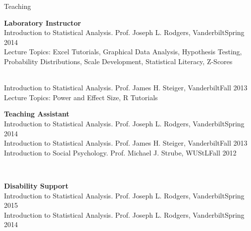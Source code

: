 \documentclass {resume}
\begin{document}
\pagebreak\begin{rSection}{\textrm{Teaching
}}
\vspace*{2pt}
\begin{minipage}{\linewidth}{\large {\bf Laboratory Instructor}\\}
Introduction to Statistical Analysis. Prof. Joseph L. Rodgers, Vanderbilt\hfill  {Spring 2014}\\
\hspace* {6 mm}Lecture Topics: Excel Tutorials, Graphical Data Analysis, Hypothesis Testing,\\
\hspace* {6 mm}Probability Distributions, Scale Development, Statistical Literacy, Z-Scores\end{minipage}\smallskip\\
Introduction to Statistical Analysis. Prof. James H. Steiger, Vanderbilt\hfill  {Fall 2013}\\
\hspace* {6 mm}Lecture Topics: Power and Effect Size, R Tutorials\medskip\\%
\begin{minipage}{\linewidth}{\large {\bf Teaching Assistant}}\\
Introduction to Statistical Analysis. Prof. Joseph L. Rodgers, Vanderbilt\hfill  {Spring 2014}\smallskip\\
Introduction to Statistical Analysis. Prof. James H. Steiger, Vanderbilt\hfill  {Fall 2013}\smallskip\\
Introduction to Social Psychology. Prof. Michael J. Strube, WUStL\hfill{Fall 2012}\end{minipage}\medskip\\
\begin{minipage}{\linewidth}{\large {\bf Disability Support}}\\
Introduction to Statistical Analysis. Prof. Joseph L. Rodgers, Vanderbilt\hfill  {Spring 2015}\smallskip\\
Introduction to Statistical Analysis. Prof. Joseph L. Rodgers, Vanderbilt\hfill{Spring 2014}\end{minipage}
\end{rSection}%
\end{document}
